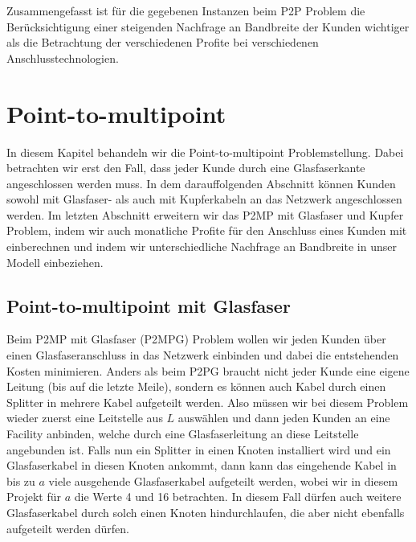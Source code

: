 \documentclass[11pt,a4paper]{article}
\theoremstyle{my_th_style1}
\begin{document}
Zusammengefasst ist f\"ur die gegebenen Instanzen beim P2P Problem die Ber\"ucksichtigung einer steigenden Nachfrage an Bandbreite der Kunden wichtiger als die Betrachtung der verschiedenen Profite bei verschiedenen Anschlusstechnologien.

\section{Point-to-multipoint}
In diesem Kapitel behandeln wir die Point-to-multipoint Problemstellung.  Dabei betrachten wir erst den Fall, dass jeder Kunde durch eine Glasfaserkante angeschlossen werden muss. In dem darauffolgenden Abschnitt k\"onnen Kunden sowohl mit Glasfaser- als auch mit Kupferkabeln an das Netzwerk angeschlossen werden. Im letzten Abschnitt erweitern wir das P2MP mit Glasfaser und Kupfer Problem, indem wir auch monatliche Profite f\"ur den Anschluss eines Kunden mit einberechnen und indem wir unterschiedliche Nachfrage an Bandbreite in unser Modell einbeziehen.

 
\subsection{Point-to-multipoint mit Glasfaser}
\label{section_p2mpg} 
 
Beim P2MP mit Glasfaser (P2MPG) Problem wollen wir jeden Kunden \"uber einen Glasfaseranschluss in das Netzwerk einbinden und dabei die entstehenden Kosten minimieren.
Anders als beim P2PG braucht nicht jeder Kunde eine eigene Leitung (bis auf die letzte Meile), sondern es k\"onnen auch Kabel durch einen Splitter in mehrere Kabel aufgeteilt werden.
Also m\"ussen wir bei diesem Problem wieder zuerst eine Leitstelle aus $L$ ausw\"ahlen und dann jeden Kunden an eine Facility anbinden, welche durch eine Glasfaserleitung an diese Leitstelle angebunden ist.
Falls nun ein Splitter in einen Knoten installiert wird und ein Glasfaserkabel in diesen Knoten ankommt, dann kann das eingehende Kabel in bis zu $a$ viele ausgehende Glasfaserkabel aufgeteilt werden, wobei wir in diesem Projekt f\"ur $a$ die Werte 4 und 16 betrachten.
In diesem Fall d\"urfen auch weitere Glasfaserkabel durch solch einen Knoten hindurchlaufen, die aber nicht ebenfalls aufgeteilt werden d\"urfen.
\end{document}
